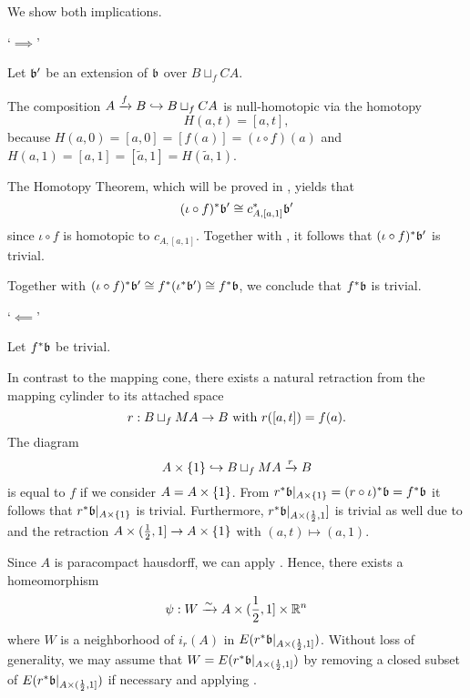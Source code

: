 \begin{myproof}
    We show both implications.

    `$\implies$'

    Let $\bb'$ be an extension of $\bb$ over $B \sqcup_f CA$.

    The composition $A \xrightarrow{f} B \hookrightarrow{} B \sqcup_f CA$ is
    null-homotopic via the homotopy
    \[ H(a, t) = [a, t], \]
    because $H(a, 0) = [a, 0] = [f(a)] = (\iota \circ f)(a)$
    and $H(a, 1) = [a, 1] = [\tilde{a}, 1] = H(\tilde{a}, 1)$.

    The Homotopy Theorem, which will be proved in ,
    yields that
    \[ \ind{(\iota \circ f)}\bb' \cong \ind{c_{A, [a, 1]}}\bb' \]
    since $\iota \circ f$ is homotopic to $c_{A, [a, 1]}$.
    Together with ,
    it follows that $\ind{(\iota \circ f)}\bb'$ is trivial.

    Together with $\ind{(\iota \circ f)}\bb' \cong \ind{f}(\ind{\iota}\bb') \cong \ind{f}\bb$,
    we conclude that $\ind{f}\bb$ is trivial.

    `$\impliedby$'

    Let $\ind{f}\bb$ be trivial.

    In contrast to the mapping cone,
    there exists a natural retraction from the mapping cylinder to its attached space
    \[ r: B \sqcup_f MA \to B \text{ with } r([a, t]) = f(a). \]
    The diagram
    \[ A \times \{1\} \hookrightarrow{} B \sqcup_f MA \xrightarrow{r} B \]
    is equal to $f$ if we consider $A = A \times{} \{1\}$.
    From $\ind{r}\bb[A \cross \{1\}] = \ind{(r \circ \iota)}\bb = \ind{f}\bb$ it follows that
    $\ind{r}\bb[A \cross \{1\}]$ is trivial.
    Furthermore, $\ind{r}\bb[A \cross (\half, 1]]$ is trivial as well
    due to  and the retraction
    $A \times (\frac{1}{2}, 1] \to A \times{} \{1\}$ with $(a, t) \mapsto (a, 1)$.

    Since $A$ is paracompact hausdorff, we can apply .
    Hence, there exists a homeomorphism
    \[ \psi: W \xrightarrow{\sim} A \times (\frac{1}{2}, 1] \times \mathbb{R}^n \]
    where $W$ is a neighborhood of $i_r(A)$ in $E(\ind{r}\bb[A \cross {(\half, 1]}])$.
    Without loss of generality,
    we may assume that $W = E(\ind{r}\bb[A \cross {(\half, 1]}])$
    by removing a closed subset of $E(\ind{r}\bb[A \cross {(\half, 1]}])$
    if necessary and applying .


\end{myproof}
